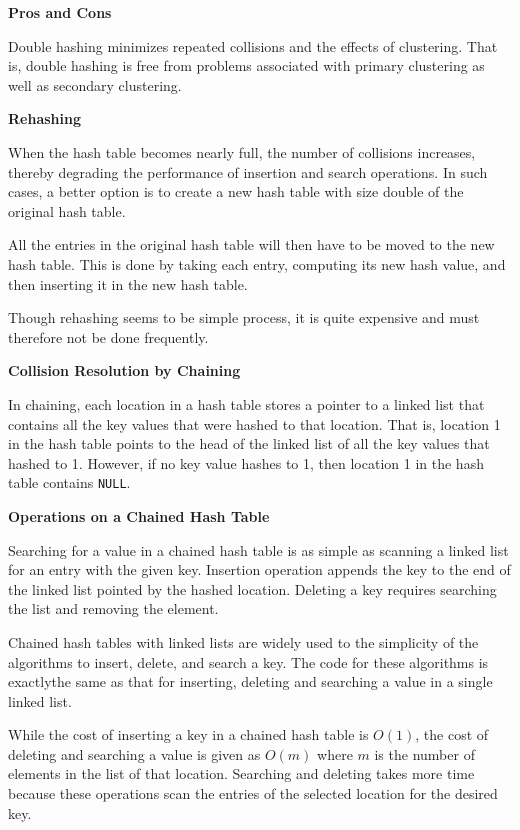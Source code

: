 \vskip 3mm
{\bf Pros and Cons}

\vskip 1mm
Double hashing minimizes repeated collisions and the effects of clustering. That is, double hashing is free from problems associated with primary clustering as well as secondary clustering.

\vskip 3mm
{\bf Rehashing}

\vskip 1mm
When the hash table becomes nearly full, the number of collisions increases, thereby degrading the performance of insertion and search operations. In such cases, a better option is to create a new hash table with size double of the original hash table.

\vskip 1mm
All the entries in the original hash table will then have to be moved to the new hash table. This is done by taking each entry, computing its new hash value, and then inserting it in the new hash table.

\vskip 1mm
Though rehashing seems to be simple process, it is quite expensive and must therefore not be done frequently.

\filbreak
\vskip 1cm
{\bf Collision Resolution by Chaining}

\vskip 1mm
In chaining, each location in a hash table stores a pointer to a linked list that contains all the key values that were hashed to that location. That is, location 1 in the hash table points to the head of the linked list of all the key values that hashed to 1. However, if no key value hashes to 1, then location 1 in the hash table contains {\tt NULL}.

\vskip 3mm
{\bf Operations on a Chained Hash Table}

\vskip 1mm
Searching for a value in a chained hash table is as simple as scanning a linked list for an entry  with the given key. Insertion operation appends the key to the end of the linked list pointed by the hashed location. Deleting a key requires searching the list and removing the element.

\vskip 1mm
Chained hash tables with linked lists are widely used to the simplicity of the algorithms to insert, delete, and search a key. The code for these algorithms is exactlythe same as that for inserting, deleting and searching a value in a single linked list.

\vskip 1mm
While the cost of inserting a key in a chained hash table is $O(1)$, the cost of deleting and searching a value is given as $O(m)$ where $m$ is the number of elements in the list of that location. Searching and deleting takes more time because these operations scan the entries of the selected location for the desired key.

